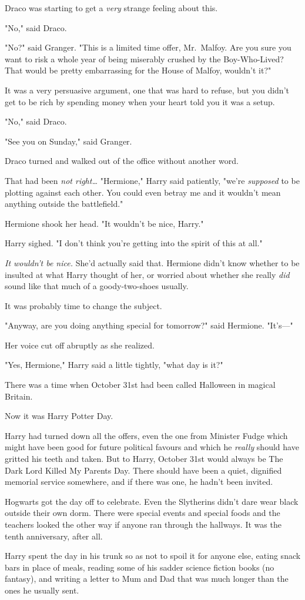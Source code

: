 Draco was starting to get a \emph{very} strange feeling about this.

"No," said Draco.

"No?" said Granger. "This is a limited time offer, Mr.~Malfoy. Are you sure you
want to risk a whole year of being miserably crushed by the Boy-Who-Lived? That
would be pretty embarrassing for the House of Malfoy, wouldn't it?"

It was a very persuasive argument, one that was hard to refuse, but you didn't
get to be rich by spending money when your heart told you it was a setup.

"No," said Draco.

"See you on Sunday," said Granger.

Draco turned and walked out of the office without another word.

That had been \emph{not right{\ldots}}
\later
"Hermione," Harry said patiently, "we're \emph{supposed} to be plotting against
each other. You could even betray me and it wouldn't mean anything outside the
battlefield."

Hermione shook her head. "It wouldn't be nice, Harry."

Harry sighed. "I don't think you're getting into the spirit of this at all."

\emph{It wouldn't be nice.} She'd actually said that. Hermione didn't know
whether to be insulted at what Harry thought of her, or worried about whether
she really \emph{did} sound like that much of a goody-two-shoes usually.

It was probably time to change the subject.

"Anyway, are you doing anything special for tomorrow?" said Hermione. "It's---"

Her voice cut off abruptly as she realized.

"Yes, Hermione," Harry said a little tightly, "what day is it?"

There was a time when October 31st had been called Halloween in magical Britain.

Now it was Harry Potter Day.

Harry had turned down all the offers, even the one from Minister Fudge which
might have been good for future political favours and which he \emph{really}
should have gritted his teeth and taken. But to Harry, October 31st would
always be The Dark Lord Killed My Parents Day. There should have been a quiet,
dignified memorial service somewhere, and if there was one, he hadn't been
invited.

Hogwarts got the day off to celebrate. Even the Slytherins didn't dare wear
black outside their own dorm. There were special events and special foods and
the teachers looked the other way if anyone ran through the hallways. It was
the tenth anniversary, after all.

Harry spent the day in his trunk so as not to spoil it for anyone else, eating
snack bars in place of meals, reading some of his sadder science fiction books
(no fantasy), and writing a letter to Mum and Dad that was much longer than the
ones he usually sent.

